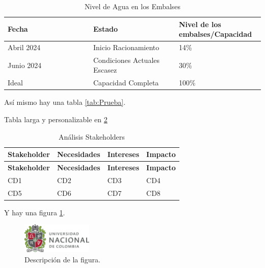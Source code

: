 \documentclass{article}
\begin{document}
\begin{table}[H]
\centering
\caption{Nivel de Agua en los Embalses}
\label{tab:NivelAgua}
\begin{tabular}{|p{0.333\linewidth}|p{0.333\linewidth}|p{0.333\linewidth}|}
\hline
\textbf{Fecha} & \textbf{Estado} & \textbf{Nivel de los embalses/Capacidad} \\
\hline
Abril 2024 & Inicio Racionamiento & 14\% \\
\hline
Junio 2024 & Condiciones Actuales Escasez & 30\% \\
\hline
Ideal & Capacidad Completa & 100\% \\
\hline
\end{tabular}
\end{table}

Así mismo hay una tabla \ref{tab:Prueba}.

Tabla larga y personalizable en \ref{tab:anaTab}

\renewcommand{\tablename}{Tabla}
\begin{longtable}{|p{3.5cm}|p{3cm}|p{3cm}|p{5cm}|} %
  \caption{Análisis Stakeholders\label{tab:anaTab}} \\
  \hline
  \textbf{Stakeholder} & \textbf{Necesidades} & \textbf{Intereses} & \textbf{Impacto} \\
  \hline
  \endfirsthead %
  \hline
  \textbf{Stakeholder} & \textbf{Necesidades} & \textbf{Intereses} & \textbf{Impacto} \\
  \hline
  \endhead %
  CD1 & CD2 & CD3 & CD4 \\
  \hline
  CD5 & CD6 & CD7 & CD8 \\
  \hline
\end{longtable}


Y hay una figura \ref{fig:ejemplo}.\\

\renewcommand{\figurename}{Figura}
\begin{figure}[htbp]
  \centering
  \includegraphics[width=0.3\textwidth]{logo_universidad.png}
  \caption{Descripción de la figura.}
  \label{fig:ejemplo}
\end{figure}
\end{document}
